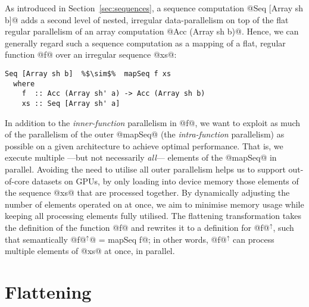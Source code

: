 As introduced in Section~\ref{sec:sequences}, a sequence computation @Seq [Array sh b]@ adds a second level of nested, irregular data-parallelism on top of the flat regular parallelism of an array computation @Acc (Array sh b)@. Hence, we can generally regard such a sequence computation as a mapping of a flat, regular function @f@ over an irregular sequence @xs@:
%
\begin{lstlisting}
Seq [Array sh b]  %$\sim$%  mapSeq f xs
  where
    f  :: Acc (Array sh' a) -> Acc (Array sh b)
    xs :: Seq [Array sh' a]
\end{lstlisting}
%
In addition to the \emph{inner-function} parallelism in @f@, we want to
exploit as much of the parallelism of the outer @mapSeq@ (the \emph{intra-function} parallelism) as possible on a
given architecture to achieve optimal performance. That is, we execute multiple ---but not necessarily \emph{all}--- elements of the @mapSeq@ in
parallel. Avoiding the need to utilise all outer parallelism helps us to support out-of-core datasets on GPUs, by only loading into
device memory those elements of the sequence @xs@ that are processed together. By
dynamically adjusting the number of elements operated on at once, we aim to
minimise memory usage while keeping all processing elements fully utilised. The flattening transformation takes the definition of the function @f@ and rewrites it to a definition for @f@$^\uparrow$, such that semantically @f@$^\uparrow$@ = mapSeq f@; in other words, @f@$^\uparrow$ can process multiple elements of @xs@ at once, in parallel.


\section{Flattening}
\label{sec:flatteing-impl}

